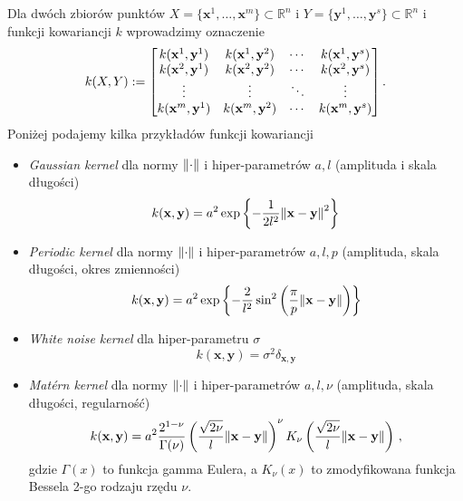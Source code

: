 \documentclass{myclass}
\numberwithin{equation}{section}
\begin{document}
Dla dwóch zbiorów punktów \(X = \{\mathbf{x}^1,\ldots,\mathbf{x}^m\} \subset \mathbb{R}^n\) i \(Y =
\{\mathbf{y}^1,\ldots,\mathbf{y}^s\} \subset \mathbb{R}^n\) i funkcji kowariancji \(k\) wprowadzimy
oznaczenie
\begin{equation}
    k(X,Y) := \mqty[k(\mathbf{x}^1, \mathbf{y}^1) & k(\mathbf{x}^1, \mathbf{y}^2) & \cdots & k(\mathbf{x}^1, \mathbf{y}^s)\\
    k(\mathbf{x}^2, \mathbf{y}^1) & k(\mathbf{x}^2, \mathbf{y}^2) & \cdots & k(\mathbf{x}^2, \mathbf{y}^s)\\
    \vdots & \vdots & \ddots & \vdots\\
    k(\mathbf{x}^m, \mathbf{y}^1) & k(\mathbf{x}^m, \mathbf{y}^2) & \cdots & k(\mathbf{x}^m, \mathbf{y}^s)\\]\,.
\end{equation}
Poniżej podajemy kilka przykładów funkcji kowariancji
\begin{itemize}
    \item \textit{Gaussian kernel} dla normy \(\norm{\cdot}\) i hiper-parametrów \(a,l\) (amplituda
    i skala długości)
    \begin{equation}
        k(\mathbf{x}, \mathbf{y}) = a^2\exp\left\{-\frac{1}{2l^2}\norm{\mathbf{x} - \mathbf{y}}^2\right\}
    \end{equation}
    
    \item \textit{Periodic kernel} dla normy \(\norm{\cdot}\) i hiper-parametrów \(a, l, p\)
    (amplituda, skala długości, okres zmienności)
    \begin{equation}
        k(\mathbf{x},\mathbf{y}) = a^2\exp\left\{-\frac{2}{l^2}\sin^2\left(\frac{\pi}{p}\norm{\mathbf{x} - \mathbf{y}}\right)\right\}
    \end{equation}

    \item \textit{White noise kernel} dla hiper-parametru \(\sigma\)
    \begin{equation}
        k(\mathbf{x},\mathbf{y}) = \sigma^2 \delta_{\mathbf{x},\mathbf{y}}
    \end{equation}

    \item \textit{Mat\'ern kernel} dla normy \(\norm{\cdot}\) i hiper-parametrów \(a, l, \nu\)
    (amplituda, skala długości, regularność)
    \begin{equation}
        k(\mathbf{x},\mathbf{y}) = a^2 \frac{2^{1-\nu}}{\Gamma(\nu)}\left(\frac{\sqrt{2\nu}}{l}\norm{\mathbf{x} - \mathbf{y}}\right)^\nu K_\nu\left(\frac{\sqrt{2\nu}}{l}\norm{\mathbf{x} - \mathbf{y}}\right)\,,
    \end{equation}
    gdzie \(\Gamma(x)\) to funkcja gamma Eulera, a \(K_\nu(x)\) to zmodyfikowana funkcja Bessela
    2-go rodzaju rzędu \(\nu\).

\end{itemize}
\end{document}
